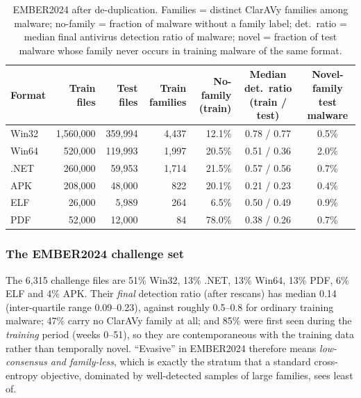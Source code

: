 \documentclass[fleqn,10pt]{wlscirep}
\begin{document}
\begin{table}[!htbp]
\centering
\scriptsize
\setlength{\tabcolsep}{2.5pt}
\caption{EMBER2024 after de-duplication. Families = distinct ClarAVy families among malware; no-family = fraction of malware without a family label; det.\ ratio = median final antivirus detection ratio of malware; novel = fraction of test malware whose family never occurs in training malware of the same format.}
\label{tab:ember-stats}
\begin{tabular}{lrrrrcc}
\toprule
Format & Train files & Test files & Train families & No-family (train) & Median det.\ ratio (train / test) & Novel-family test malware \\
\midrule
Win32 & 1,560,000 & 359,994 & 4,437 & 12.1\% & 0.78 / 0.77 & 0.5\% \\
Win64 & 520,000 & 119,993 & 1,997 & 20.5\% & 0.51 / 0.36 & 2.0\% \\
.NET  & 260,000 & 59,953 & 1,714 & 21.5\% & 0.57 / 0.56 & 0.7\% \\
APK   & 208,000 & 48,000 & 822 & 20.1\% & 0.21 / 0.23 & 0.4\% \\
ELF   & 26,000 & 5,989 & 264 & 6.5\% & 0.50 / 0.49 & 0.9\% \\
PDF   & 52,000 & 12,000 & 84 & 78.0\% & 0.38 / 0.26 & 0.7\% \\
\bottomrule
\end{tabular}
\end{table}

\subsubsection{The EMBER2024 challenge set}
The 6,315 challenge files are 51\% Win32, 13\% .NET, 13\% Win64, 13\% PDF, 6\% ELF and 4\% APK. Their \emph{final} detection ratio (after rescans) has median 0.14 (inter-quartile range 0.09--0.23), against roughly 0.5--0.8 for ordinary training malware; 47\% carry no ClarAVy family at all; and 85\% were first seen during the \emph{training} period (weeks 0--51), so they are contemporaneous with the training data rather than temporally novel. ``Evasive'' in EMBER2024 therefore means \emph{low-consensus and family-less}, which is exactly the stratum that a standard cross-entropy objective, dominated by well-detected samples of large families, sees least of.
\end{document}

